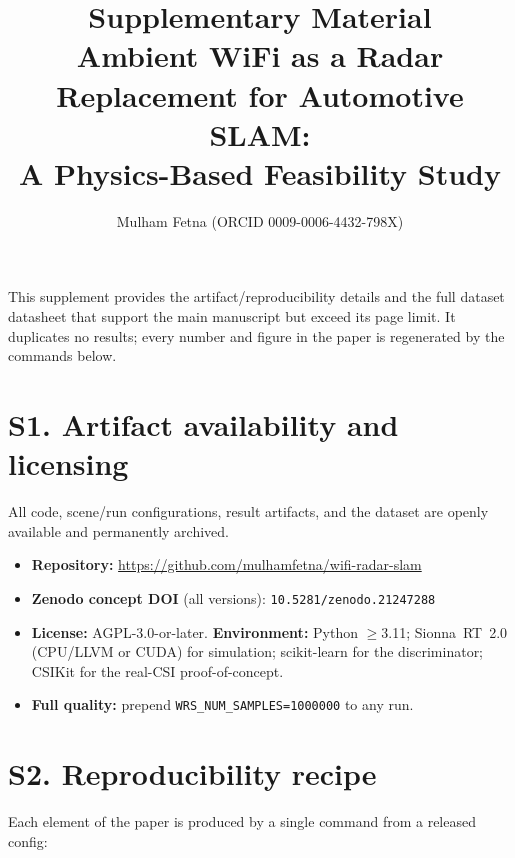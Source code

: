 \documentclass[10pt]{article}
\title{Supplementary Material\\[2pt]
\large Ambient WiFi as a Radar Replacement for Automotive SLAM:\\
A Physics-Based Feasibility Study}
\author{Mulham Fetna \quad (ORCID 0009-0006-4432-798X)}
\date{}
\begin{document}
\maketitle

This supplement provides the artifact/reproducibility details and the full dataset
datasheet that support the main manuscript but exceed its page limit. It duplicates
no results; every number and figure in the paper is regenerated by the commands
below.

\section*{S1. Artifact availability and licensing}
All code, scene/run configurations, result artifacts, and the dataset are openly
available and permanently archived.
\begin{itemize}
\item \textbf{Repository:} \url{https://github.com/mulhamfetna/wifi-radar-slam}
\item \textbf{Zenodo concept DOI} (all versions): \texttt{10.5281/zenodo.21247288}
\item \textbf{License:} AGPL-3.0-or-later. \textbf{Environment:} Python $\geq$3.11;
Sionna~RT~2.0 (CPU/LLVM or CUDA) for simulation; scikit-learn for the discriminator;
CSIKit for the real-CSI proof-of-concept.
\item \textbf{Full quality:} prepend \texttt{WRS\_NUM\_SAMPLES=1000000} to any run.
\end{itemize}

\section*{S2. Reproducibility recipe}
Each element of the paper is produced by a single command from a released config:
\end{document}
